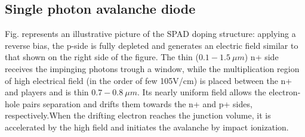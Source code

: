 \subsection*{Single photon avalanche diode}
Fig. represents an illustrative picture of the SPAD doping structure: applying a reverse bias, the p-side is fully depleted and generates an electric field similar to that shown on the right side of the figure. The thin ($0.1-1.5\ \mu m$) n+ side receives the impinging photons trough a window, while the multiplication region of high electrical field (in the order of few 105V/cm) is placed between the n+ and players and is thin $0.7-0.8\ \mu m$. Its nearly uniform field allows the electron-hole pairs separation and drifts them towards the n+ and p+ sides, respectively.When the drifting electron reaches the junction volume, it is accelerated by the high field and initiates the avalanche by impact ionization.

